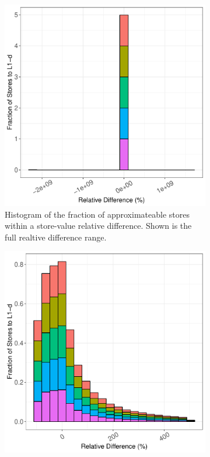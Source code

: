 \begin{figure}[htbp]
	\begin{subfigure}{0.33\textwidth}
		\centering
		\includegraphics[scale=0.4]{graphs/pca_top5/full_hist.pdf}
		\caption{Histogram of the fraction of approximateable stores within a store-value relative difference. Shown is the full realtive difference range.}
	\end{subfigure}
	\begin{subfigure}{0.33\textwidth}
		\centering
		\includegraphics[scale=0.4]{graphs/pca_top5/narrow_hist.pdf}

\end{subfigure}
\end{figure}

